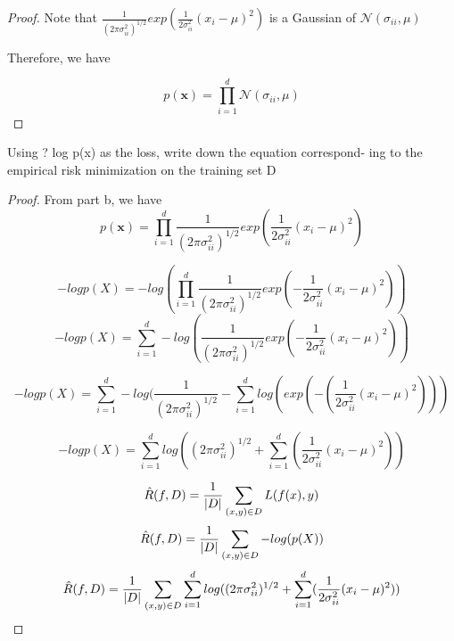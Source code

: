 \documentclass[12pt]{article}
\newenvironment{problem}[2][Problem]{\begin{trivlist}
\item[\hskip \labelsep {\bfseries #1}\hskip \labelsep {\bfseries #2.}]}{\end{trivlist}}
\begin{document}
\begin{proof}
Note that $\frac{1}{(2\pi \sigma_{ii}^2)^{1/2} } exp (\frac{1}{2 \sigma_{ii}^2}(x_i - \mu)^2)$ is a Gaussian of $\mathcal{N}(\sigma_{ii}, \mu)$

Therefore, we have

\begin{equation*}
p(\bm{x}) = \prod_{i =1}^{d} \mathcal{N}(\sigma_{ii}, \mu)
\end{equation*}

\end{proof}

\begin{problem}{3.4(c)}
Using ? log p(x) as the loss, write down the equation correspond- ing to the empirical risk minimization on the training set D
\end{problem}
\begin{proof}
From part b, we have
\begin{equation*}
p(\bm{x}) = \prod_{i=1}^{d} \frac{1}{(2\pi \sigma_{ii}^2)^{1/2} } exp (\frac{1}{2 \sigma_{ii}^2}(x_i - \mu)^2) 
\end{equation*}

\begin{equation*}
-log p(X) = -log (\prod_{i=1}^{d} \frac{1}{(2\pi \sigma_{ii}^2)^{1/2} } exp (-\frac{1}{2 \sigma_{ii}^2}(x_i - \mu)^2) )
\end{equation*}
\begin{equation*}
-log p(X) =\sum_{i=1}^{d}  -log (\frac{1}{(2\pi \sigma_{ii}^2)^{1/2} } exp (-\frac{1}{2 \sigma_{ii}^2}(x_i - \mu)^2) )
\end{equation*}

\begin{equation*}
-log p(X) = \sum_{i=1}^{d}  -log (\frac{1}{(2\pi \sigma_{ii}^2)^{1/2} } - \sum_{i=1}^{d} log(exp( -(\frac{1}{2 \sigma_{ii}^2}(x_i - \mu)^2) ))
\end{equation*}

\begin{equation*}
-log p(X) = \sum_{i=1}^{d} log ((2\pi \sigma_{ii}^2)^{1/2}  + \sum_{i=1}^{d}  (\frac{1}{2 \sigma_{ii}^2}(x_i - \mu)^2) )
\end{equation*}

\begin{equation*}
\hat{R}(f, D) = \frac{1}{\abs{D}} \sum_{(x , y)\in D} L(f(x), y)
\end{equation*}
\begin{equation*}
\hat{R}(f, D) = \frac{1}{\abs{D}} \sum_{(x , y)\in D} -log(p(X))
\end{equation*}
\begin{equation*}
\hat{R}(f, D) =\frac{1}{\abs{D}} \sum_{(x , y)\in D} \sum_{i=1}^{d} log ((2\pi \sigma_{ii}^2)^{1/2}  + \sum_{i=1}^{d}  (\frac{1}{2 \sigma_{ii}^2}(x_i - \mu)^2) )
\end{equation*}

\end{proof}
\end{document}

